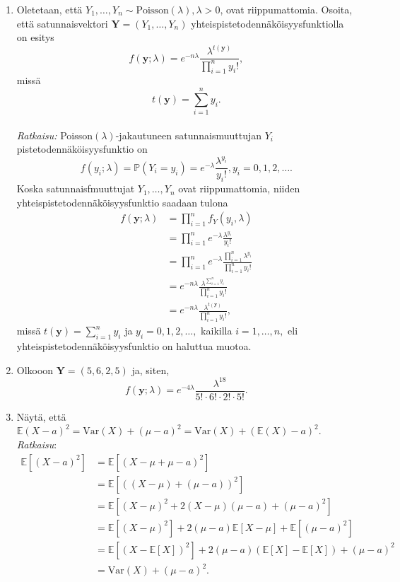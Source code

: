 \documentclass[12pt]{article}
\begin{document}
\begin{enumerate}
\item[1.] Oletetaan, että $Y_1, \ldots, Y_n \sim \text{Poisson}(\lambda), \lambda > 0$, ovat riippumattomia. Osoita, että satunnaisvektori $\mathbf{Y} = (Y_1, \ldots, Y_n)$ yhteispistetodennäköisyysfunktiolla on esitys
$$
f(\mathbf{y}; \lambda) = e^{-n\lambda} \frac{\lambda^{t(\mathbf{y})}}{\prod_{i = 1}^n y_i!},
$$
missä 
$$
t(\mathbf{y}) = \sum_{i = 1}^n y_i.
$$
\\
\textit{Ratkaisu:} Poisson$(\lambda)$-jakautuneen satunnaismuuttujan $Y_i$ pistetodennäköisyysfunktio on 
$$
f(y_i; \lambda) = \mathbb{P}(Y_i = y_i) = e^{-\lambda} \frac{\lambda^{y_i}}{y_i!}, y_i = 0, 1, 2, \ldots.
$$
Koska satunnaisfmuuttujat $Y_1, \ldots, Y_n$ ovat riippumattomia, niiden yhteispistetodennäköisyysfunktio saadaan tulona
$$
\begin{aligned}
f(\mathbf{y}; \lambda) &= \prod_{i = 1}^n f_Y(y_i, \lambda) \\
    &= \prod_{i = 1}^n e^{-\lambda} \frac{\lambda^{y_i}}{y_i!} \\
    &= \prod_{i = 1}^n e^{-\lambda} \frac{\prod_{i = 1}^n \lambda^{y_i}}{\prod_{i = 1}^n y_i!} \\
    &= e^{-n\lambda} \frac{\lambda^{\sum_{i = 1}^n y_i}}{\prod_{i = 1}^n y_i!}  \\
    &= e^{-n\lambda} \frac{\lambda^{t(\mathbf{y})}}{\prod_{i = 1}^n y_i!},
\end{aligned}
$$
missä $t(\mathbf{y}) = \sum_{i = 1}^n y_i$ ja $y_i = 0, 1, 2, \ldots,$ kaikilla $i = 1, \ldots, n,$ eli yhteispistetodennäköisyysfunktio on haluttua muotoa.

\item[2.]
Olkooon $\mathbf{Y} = (5, 6, 2, 5)$ ja, siten,
$$
f(\mathbf{y}; \lambda) = e^{-4\lambda} \frac{\lambda^{18}}{5! \cdot 6! \cdot 2! \cdot 5!}.
$$

\item[4.] Näytä, että $\mathbb{E}(X - a)^2 = \text{Var}(X) + (\mu - a)^2 = \text{Var}(X) + (\mathbb{E}(X) - a)^2$.
\\
\textit{Ratkaisu}: 
$$
\begin{aligned}
\mathbb{E}[(X - a)^2] &= \mathbb{E}[(X - \mu + \mu - a)^2] \\
    &= \mathbb{E}[((X - \mu) + (\mu - a))^2] \\
    &= \mathbb{E}[(X - \mu)^2 + 2(X - \mu)(\mu - a) + (\mu - a)^2] \\
    &= \mathbb{E}[(X - \mu)^2] + 2(\mu - a)\mathbb{E}[X - \mu] + \mathbb{E}[(\mu - a)^2] \\
    &= \mathbb{E}[(X - \mathbb{E}[X])^2] + 2(\mu -a)(\mathbb{E}[X] - \mathbb{E}[X]) + (\mu - a)^2 \\
    &= \text{Var}(X) + (\mu - a)^2.
\end{aligned}
$$


\end{enumerate}
\end{document}
